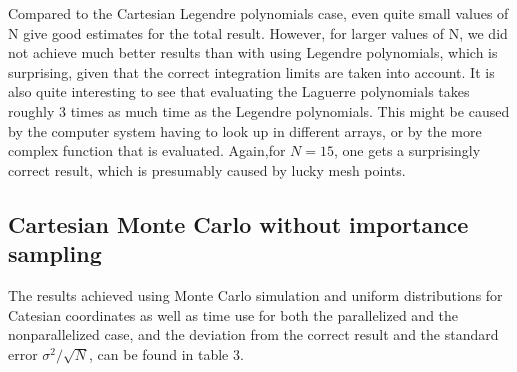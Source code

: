 \documentclass[10pt,a4paper]{article}
\begin{document}
Compared to the Cartesian Legendre polynomials case, even quite small values of N give good estimates for the total result. However, for larger values of N, we did not achieve much better results than with using Legendre polynomials, which is surprising, given that the correct integration limits are taken into account. It is also quite interesting to see that evaluating the Laguerre polynomials takes roughly 3 times as much time as the Legendre polynomials. This might be caused by the computer system having to look up in different arrays, or by the more complex function that is evaluated. Again,for $N=15$, one gets a surprisingly correct result, which is presumably caused by lucky mesh points.
\subsection{Cartesian Monte Carlo without importance sampling}
The results achieved using Monte Carlo simulation and uniform distributions for Catesian coordinates as well as time use for both the parallelized and the nonparallelized case, and the deviation from the correct result and the standard error $\sigma^2/\sqrt{N}$, can be found in table 3.

\begin{comment}

\begin{table}[H]
\caption[Cartesian Monte Carlo without importance sampling]{Achieved results, relative error, time-usage in seconds (averaged over 5 simulations) for both the nonparallel and the parallel program (without optimization flags) as well as standard error for different values of N for Cartesian Monte Carlo without importance sampling. The result with the median relative error is presented, the standard error is calculated from the averaged variance over 5 runs.}
\begin{tabular}{|l|l|l|l|l|l|}
\hline
N          & Result   & Relative Error & \pbox{10cm}{time {[}s{]}\\ parallelized}  &  \pbox{10cm}{time {[}s{]}\\ nonparallelized} &  \pbox{10cm}{Standard\\ Error} \\ \hline
$10^3$ & 0.122134 & 0.366414   & 0.0003482432 & 0.0003056 & 0.1344    \\ \hline
$10^4$ & 0.140808 & 0.269539   & 0.002769808  & 0.0034032 & 0.2318    \\ \hline
$10^5$ & 0.20568  & 0.066995   & 0.02500496   & 0.0328912 & 0.02865   \\ \hline
$10^6$ & 0.183756 & 0.046738   & 0.10475636   & 0.3262482 & 0.008598  \\ \hline
$10^7$ & 0.191025 & 0.00902881 & 0.8515582    & 3.090702  & 0.006693  \\ \hline
$10^8$ & 0.192471 & 0.00152991 & 8.520786     & 29.38188  & 0.0009739 \\ \hline
$10^9$ & 0.192261 & 0.00261722 & 91.32978     & -         & 0.0003159 \\ \hline
\end{tabular}
\end{table}

\end{comment}
\end{document}

